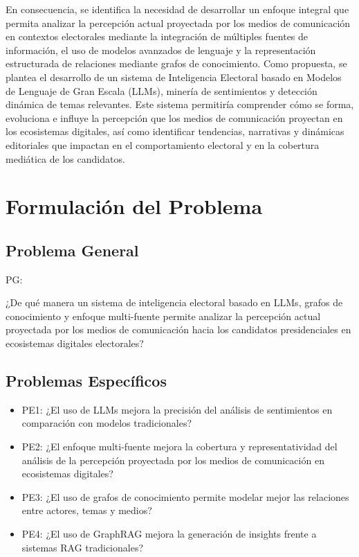 En consecuencia, se identifica la necesidad de desarrollar un enfoque integral que permita analizar la percepción actual proyectada por los medios de comunicación en contextos electorales mediante la integración de múltiples fuentes de información, el uso de modelos avanzados de lenguaje y la representación estructurada de relaciones mediante grafos de conocimiento. Como propuesta, se plantea el desarrollo de un sistema de Inteligencia Electoral basado en Modelos de Lenguaje de Gran Escala (LLMs), minería de sentimientos y detección dinámica de temas relevantes. Este sistema permitiría comprender cómo se forma, evoluciona e influye la percepción que los medios de comunicación proyectan en los ecosistemas digitales, así como identificar tendencias, narrativas y dinámicas editoriales que impactan en el comportamiento electoral y en la cobertura mediática de los candidatos.

\section{Formulación del Problema}

\subsection{Problema General}
PG: \newcommand{\ProblemaGeneral}{
¿De qué manera un sistema de inteligencia electoral basado en LLMs, grafos de conocimiento y enfoque multi-fuente permite analizar la percepción actual proyectada por los medios de comunicación hacia los candidatos presidenciales en ecosistemas digitales electorales?
}
\ProblemaGeneral

\subsection{Problemas Específicos}

\newcommand{\Pbone}{¿El uso de LLMs mejora la precisión del análisis de sentimientos en comparación con modelos tradicionales?}
\newcommand{\Pbtwo}{¿El enfoque multi-fuente mejora la cobertura y representatividad del análisis de la percepción proyectada por los medios de comunicación en ecosistemas digitales?}
\newcommand{\Pbthree}{¿El uso de grafos de conocimiento permite modelar mejor las relaciones entre actores, temas y medios?}
\newcommand{\Pbfour}{¿El uso de GraphRAG mejora la generación de insights frente a sistemas RAG tradicionales?}

\begin{itemize}
	\item PE1: {\Pbone}
	\item PE2: {\Pbtwo}
	\item PE3: {\Pbthree}
	\item PE4: {\Pbfour}
\end{itemize}


